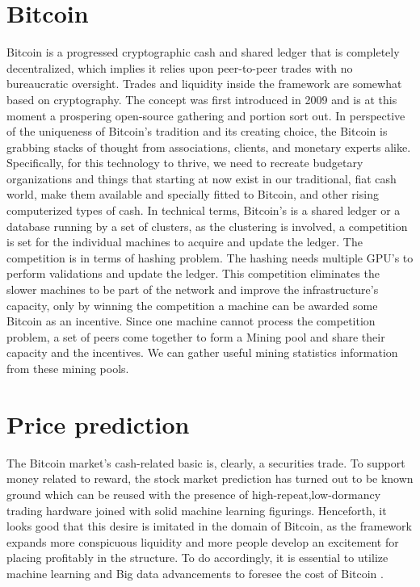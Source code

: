 \documentclass[sigconf]{acmart}
\begin{document}
\section{Bitcoin}
Bitcoin is a progressed cryptographic cash and shared ledger that is completely decentralized, which implies it relies upon peer-to-peer trades with no bureaucratic oversight. Trades and liquidity inside the framework are somewhat based on cryptography. The concept was first introduced in 2009  \cite{Bitcoin} and is at this moment a prospering open-source gathering and portion sort out. In perspective of the uniqueness of Bitcoin's tradition and its creating choice, the Bitcoin is grabbing stacks of thought from associations, clients, and monetary experts alike. Specifically, for this technology to thrive, we need to recreate budgetary organizations and things that starting at now exist in our traditional, fiat cash world, make them available and specially fitted to Bitcoin, and other rising computerized types of cash.
In technical terms, Bitcoin's is a shared ledger or a database running by a set of clusters, as the clustering is involved, a competition is set for the individual machines to acquire and update the ledger. The competition is in terms of hashing problem. The hashing needs multiple GPU's to perform validations and update the ledger. This competition eliminates the slower machines to be part of the network and improve the infrastructure's capacity, only by winning the competition a machine can be awarded some Bitcoin as an incentive. Since one machine cannot process the competition problem, a set of peers come together to form a Mining pool and share their capacity and the incentives. We can gather useful mining statistics information from these mining pools.
 
 \section{Price prediction}
 The Bitcoin market's cash-related basic is, clearly, a securities trade. To support money related to reward, the stock market prediction has turned out to be known ground which can be reused with the presence of high-repeat,low-dormancy trading hardware joined with solid machine learning figurings. Henceforth, it looks good that this desire is imitated in the domain of Bitcoin, as the framework expands more conspicuous liquidity and more people develop an excitement for placing profitably in the structure. To do accordingly, it is essential to utilize machine learning and Big data advancements to foresee the cost of Bitcoin \cite{stock}.
 
\end{document}
